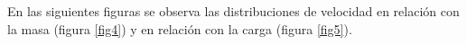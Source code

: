 \documentclass{article}
\begin{document}
En las siguientes figuras se observa las distribuciones de velocidad en relación con la masa (figura \ref{fig4}) y en relación con la carga (figura \ref{fig5}).
\begin{figure}[!h]
\centering
{}

\end{figure}
\end{document}
